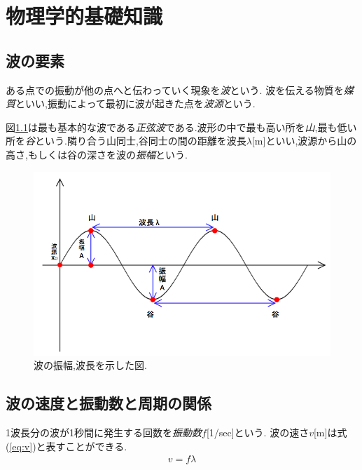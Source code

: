 

\chapter{物理学的基礎知識}
\section{波の要素}
ある点での振動が他の点へと伝わっていく現象を\emph{波}という.
波を伝える物質を\emph{媒質}といい,振動によって最初に波が起きた点を\emph{波源}という.

図\ref{fig:sin}は最も基本的な波である\emph{正弦波}である.波形の中で最も高い所を\emph{山},最も低い所を\emph{谷}という.隣り合う山同士,谷同士の間の距離を波長$\lambda$[m]といい,波源から山の高さ,もしくは谷の深さを波の\emph{振幅}という.


\begin{figure}[htbp]
 \begin{center}
  \includegraphics[width=150mm]{../background/lambdasin.png}
 \end{center}
 \caption{波の振幅,波長を示した図.}
 \label{fig:sin}
\end{figure}

\newpage

\section{波の速度と振動数と周期の関係}
1波長分の波が1秒間に発生する回数を\emph{振動数$f$}[1/sec]という.
波の速さ$v$[m]は式(\ref{eq:v})と表すことができる.
\begin{eqnarray}
\label{eq:v}
v=f \lambda
\end{eqnarray}

